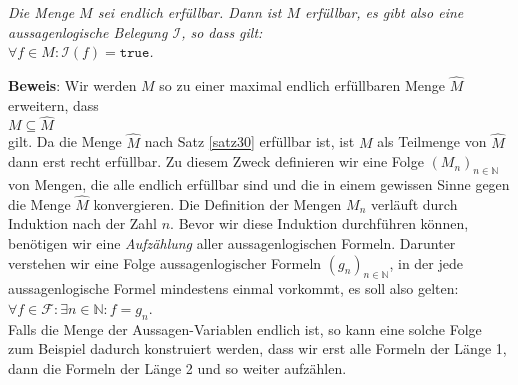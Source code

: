 \begin{Satz}
{\em
  Die Menge $M$ sei endlich erfüllbar.  Dann ist $M$ erfüllbar, es gibt also eine aussagenlogische
  Belegung $\mathcal{I}$, so dass gilt:
  \\[0.2cm]
  \hspace*{1.3cm}
  $\forall f \in M: \mathcal{I}(f) = \mathtt{true}$.
} 
\end{Satz}

\noindent
\textbf{Beweis}:  Wir werden $M$ so zu einer maximal endlich erfüllbaren Menge $\widehat{M}$
erweitern, dass 
\\[0.2cm]
\hspace*{1.3cm}
$M \subseteq \widehat{M}$
\\[0.2cm]
gilt.  Da die Menge $\widehat{M}$ nach Satz \ref{satz30} erfüllbar ist, ist $M$ als Teilmenge von
$\widehat{M}$ dann erst recht erfüllbar.
Zu diesem Zweck definieren wir eine Folge $(M_n)_{n\in \mathbb{N}}$ von Mengen, die alle endlich
erfüllbar sind und die in einem gewissen Sinne gegen die Menge $\widehat{M}$ konvergieren.
Die Definition der Mengen $M_n$ verläuft durch Induktion nach der Zahl $n$.  Bevor wir diese
Induktion durchführen können, benötigen wir eine \emph{Aufzählung} aller aussagenlogischen Formeln.
Darunter verstehen wir eine Folge aussagenlogischer Formeln $(g_n)_{n \in \mathbb{N}}$, in der jede
aussagenlogische Formel mindestens einmal vorkommt, es soll also gelten:
\\[0.2cm]
\hspace*{1.3cm}
$\forall f \in \mathcal{F}: \exists n \in \mathbb{N}: f = g_n$.
\\[0.2cm]
Falls die Menge der Aussagen-Variablen endlich ist, so kann eine solche Folge zum Beispiel dadurch konstruiert
werden, dass wir erst alle Formeln der Länge 1, dann die Formeln der Länge 2 und so weiter
aufzählen.  

